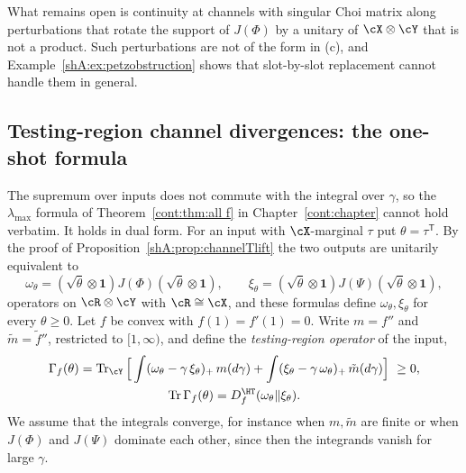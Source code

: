 What remains open is continuity at channels with singular Choi matrix along perturbations that rotate the support of $J(\Phi)$ by a unitary of $\cX\otimes\cY$ that is not a product. Such perturbations are not of the form in (c), and Example~\ref{shA:ex:petzobstruction} shows that slot-by-slot replacement cannot handle them in general.

\subsection*{Testing-region channel divergences: the one-shot formula}

The supremum over inputs does not commute with the integral over $\gamma$, so the $\lambda_{\max}$ formula of Theorem~\ref{cont:thm:all f} in Chapter~\ref{cont:chapter} cannot hold verbatim. It holds in dual form. For an input with $\cX$-marginal $\tau$ put $\theta=\tau^{\mathsf T}$. By the proof of Proposition~\ref{shA:prop:channelTlift} the two outputs are unitarily equivalent to
\[
\omega_\theta=(\sqrt\theta\otimes\mathbf 1)J(\Phi)(\sqrt\theta\otimes\mathbf 1),\qquad \xi_\theta=(\sqrt\theta\otimes\mathbf 1)J(\Psi)(\sqrt\theta\otimes\mathbf 1),
\]
operators on $\cR\otimes\cY$ with $\cR\cong\cX$, and these formulas define $\omega_\theta,\xi_\theta$ for every $\theta\ge0$. Let $f$ be convex with $f(1)=f'(1)=0$. Write $m=f''$ and $\tilde m=\tilde f''$, restricted to $[1,\infty)$, and define the \emph{testing-region operator} of the input,
\begin{gather*}
\Gamma_f(\theta)=\Tr_\cY\Big[\int(\omega_\theta-\gamma\,\xi_\theta)_+\,m(d\gamma)+\int(\xi_\theta-\gamma\,\omega_\theta)_+\,\tilde m(d\gamma)\Big]\ \ge0,\\
 \Tr\Gamma_f(\theta)=D^\HT_f(\omega_\theta\|\xi_\theta).
\end{gather*}
We assume that the integrals converge, for instance when $m,\tilde m$ are finite or when $J(\Phi)$ and $J(\Psi)$ dominate each other, since then the integrands vanish for large $\gamma$.

